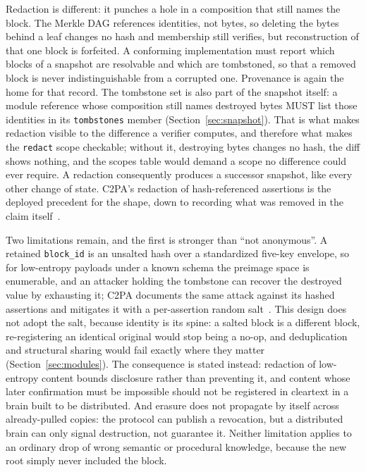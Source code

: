 \documentclass[11pt,a4paper]{article}
\begin{document}
Redaction is different: it punches a hole in a composition that still names the
block. The Merkle DAG references identities, not bytes, so deleting the bytes
behind a leaf changes no hash and membership still verifies, but reconstruction
of that one block is forfeited. A conforming implementation must report which
blocks of a snapshot are resolvable and which are tombstoned, so that a
removed block is never indistinguishable from a corrupted one. Provenance is
again the home for that record. The tombstone set is also part of the snapshot
itself: a module reference whose composition still names destroyed bytes MUST
list those identities in its \texttt{tombstones} member
(Section~\ref{sec:snapshot}). That is what makes redaction visible to the
difference a verifier computes, and therefore what makes the \texttt{redact}
scope checkable; without it, destroying bytes changes no hash, the diff shows
nothing, and the scopes table would demand a scope no difference could ever
require. A redaction consequently produces a successor snapshot, like every
other change of state. C2PA's redaction of hash-referenced assertions is the
deployed precedent for the shape, down to recording what was removed in the
claim itself~\cite{c2pa_spec}.

Two limitations remain, and the first is stronger than ``not anonymous''. A
retained \texttt{block\_id} is an unsalted hash over a standardized five-key
envelope, so for low-entropy payloads under a known schema the preimage space
is enumerable, and an attacker holding the tombstone can recover the destroyed
value by exhausting it; C2PA documents the same attack against its hashed
assertions and mitigates it with a per-assertion random salt~\cite{c2pa_spec}.
This design does not adopt the salt, because identity is its spine: a salted
block is a different block, re-registering an identical original would stop
being a no-op, and deduplication and structural sharing would fail exactly
where they matter (Section~\ref{sec:modules}). The consequence is stated
instead: redaction of low-entropy content bounds disclosure rather than
preventing it, and content whose later confirmation must be impossible should
not be registered in cleartext in a brain built to be distributed. And erasure does not propagate by itself across
already-pulled copies: the protocol can publish a revocation, but a distributed
brain can only signal destruction, not guarantee it. Neither limitation applies
to an ordinary drop of wrong semantic or procedural knowledge, because the new
root simply never included the block.
\end{document}
